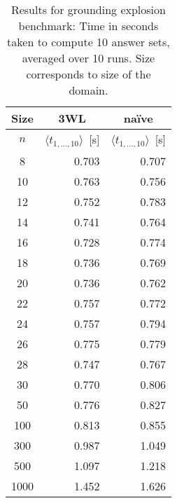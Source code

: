 \documentclass[final]{vutinfth} %
\begin{document}
\begin{table}
\begin{center}
\begin{tabular}{|c||r|r|}
\hline
Size & \multicolumn{1}{c|}{3WL} & \multicolumn{1}{c|}{na\"{i}ve} \\ 
\hline
$n$ & $\langle t_{1, \ldots, 10} \rangle$~[s]& $\langle t_{1, \ldots, 10} \rangle$~[s]\\
\hline
\hline
   8 & 	  0.703 &	  0.707 \\
  10 & 	  0.763 &	  0.756 \\
  12 & 	  0.752 &	  0.783 \\
  14 & 	  0.741 &	  0.764 \\
  16 & 	  0.728 &	  0.774 \\
  18 & 	  0.736 &	  0.769 \\
  20 & 	  0.736 &	  0.762 \\
  22 & 	  0.757 &	  0.772 \\
  24 & 	  0.757 &	  0.794 \\
  26 & 	  0.775 &	  0.779 \\
  28 & 	  0.747 &	  0.767 \\
  30 & 	  0.770 &	  0.806 \\
  50 & 	  0.776 &	  0.827 \\
 100 & 	  0.813 &	  0.855 \\
 300 & 	  0.987 &	  1.049 \\
 500 & 	  1.097 &	  1.218 \\
1000 & 	  1.452 &	  1.626 \\
\hline
\end{tabular}
\end{center}
\caption[Results for grounding explosion benchmark]{Results for grounding explosion benchmark: Time in seconds taken to compute 10 answer sets, averaged over 10 runs. Size corresponds to size of the domain.}
\label{tbl:gex}
\end{table}
\end{document}
